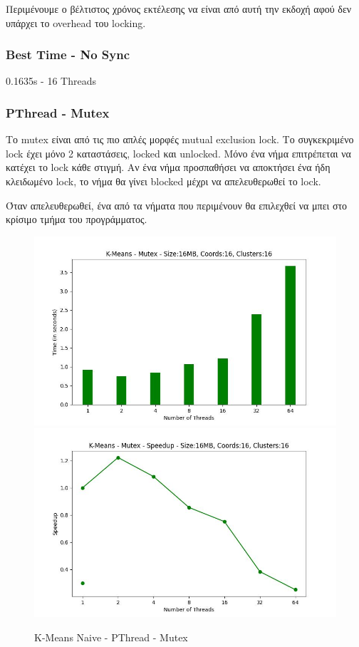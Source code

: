 \documentclass[letterpaper,12pt]{article}
\begin{document}
Περιμένουμε ο βέλτιστος χρόνος εκτέλεσης να είναι από αυτή την εκδοχή αφού δεν υπάρχει το overhead
του locking.

\subsubsection*{Best Time - No Sync}
0.1635s - 16 Threads

\subsubsection{PThread - Mutex}

Το mutex είναι από τις πιο απλές μορφές mutual exclusion lock. Το συγκεκριμένο lock έχει μόνο 2 καταστάσεις,
locked και unlocked. Μόνο ένα νήμα επιτρέπεται να κατέχει το lock κάθε στιγμή. Αν ένα νήμα προσπαθήσει να 
αποκτήσει ένα ήδη κλειδωμένο lock, το νήμα θα γίνει blocked μέχρι να απελευθερωθεί το lock.

Όταν απελευθερωθεί, ένα από τα νήματα που περιμένουν θα επιλεχθεί να μπει στο κρίσιμο τμήμα του
προγράμματος.

\begin{figure}[H]
    \centering
        \includegraphics[scale=0.4]{outFiles/plots/kmeans_locks_pthread_mutex.jpg}
        \includegraphics[scale=0.4]{outFiles/plots/kmeans_locks_pthread_mutex_speedup.jpg}
    \caption{K-Means Naive - PThread - Mutex}
    \label{fig:K-Means Naive - PThread - Mutex}
\end{figure}
\end{document}
